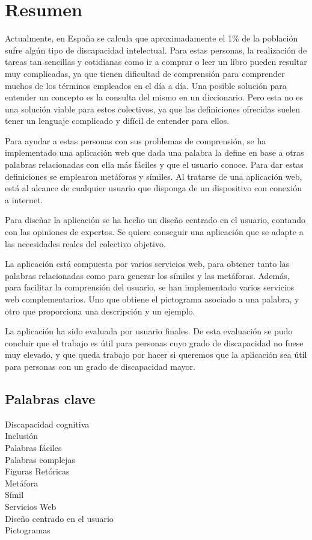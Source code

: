 \chapter*{Resumen}

Actualmente, en España se calcula que aproximadamente el 1\% de la población sufre algún tipo de discapacidad intelectual. Para estas personas, la realización de tareas tan sencillas y cotidianas como ir a comprar o leer un libro pueden resultar muy complicadas, ya que tienen dificultad de comprensión para comprender muchos de los términos empleados en el día a día. Una posible solución para entender un concepto es la consulta del mismo en un diccionario. Pero esta no es una solución viable para estos colectivos, ya que las definiciones ofrecidas suelen tener un lenguaje complicado y difícil de entender para ellos.

Para ayudar a estas personas con sus problemas de comprensión, se ha implementado una aplicación web que dada una palabra la define en base a otras palabras relacionadas con ella más fáciles y que el usuario conoce. Para dar estas definiciones se emplearon metáforas y símiles. Al tratarse de una aplicación web, está al alcance de cualquier usuario que disponga de un dispositivo con conexión a internet.

Para diseñar la aplicación se ha hecho un diseño centrado en el usuario, contando con las opiniones de expertos. Se quiere conseguir una aplicación que se adapte a las necesidades reales del colectivo objetivo.

La aplicación está compuesta por varios servicios web, para obtener tanto las palabras relacionadas como para generar los símiles y las metáforas. Además, para facilitar la comprensión del usuario, se han implementado varios servicios web complementarios. Uno que obtiene el pictograma asociado a una palabra, y otro que proporciona una descripción y un ejemplo.

La aplicación ha sido evaluada por usuario finales. De esta evaluación se pudo concluir que el trabajo es útil para personas cuyo grado de discapacidad no fuese muy elevado, y que queda trabajo por hacer si queremos que la aplicación sea útil para personas con un grado de discapacidad mayor.


\section*{Palabras clave}
   
\noindent Discapacidad cognitiva\\
\noindent Inclusión\\
\noindent Palabras fáciles\\
\noindent Palabras complejas\\
\noindent Figuras Retóricas\\
\noindent Metáfora\\
\noindent Símil\\
\noindent Servicios Web\\
\noindent Diseño centrado en el usuario\\
\noindent Pictogramas\\

   


